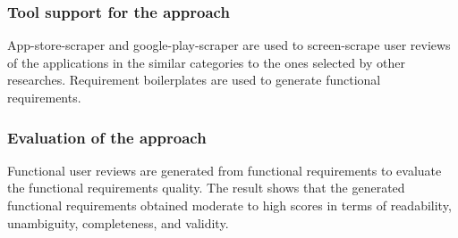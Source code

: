 \subsubsection{Tool support for the approach}
App-store-scraper and google-play-scraper are used to screen-scrape user reviews of the applications in the similar categories to the ones selected by other researches. Requirement boilerplates are used to generate functional requirements.

\subsubsection{Evaluation of the approach}
Functional user reviews are generated from functional requirements to evaluate the functional requirements quality.
The result shows that the generated functional requirements obtained moderate to high scores in terms of readability, unambiguity, completeness, and validity.


